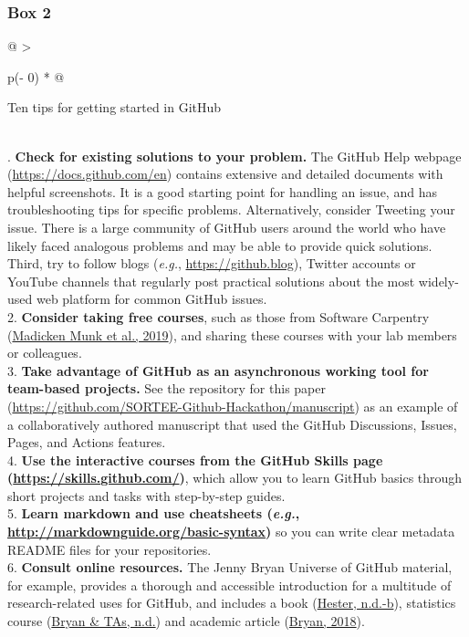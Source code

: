 \hypertarget{tips}{%
\subsubsection{Box 2}\label{tips}}

\begin{tablenos:no-prefix-table-caption}

\begin{longtable}[]{@{}
  >{\raggedright\arraybackslash}p{(\columnwidth - 0\tabcolsep) * }@{}}
\toprule
\begin{minipage}[b]{\linewidth}\raggedright
Ten tips for getting started in GitHub
\end{minipage} \\
\midrule
{}. \textbf{Check for existing solutions to your problem.} The GitHub Help webpage (\url{https://docs.github.com/en}) contains extensive and detailed documents with helpful screenshots. It is a good starting point for handling an issue, and has troubleshooting tips for specific problems. Alternatively, consider Tweeting your issue. There is a large community of GitHub users around the world who have likely faced analogous problems and may be able to provide quick solutions. Third, try to follow blogs (\emph{e.g.}, \url{https://github.blog}), Twitter accounts or YouTube channels that regularly post practical solutions about the most widely-used web platform for common GitHub issues. \\
2. \textbf{Consider taking free courses}, such as those from Software Carpentry (\protect\hyperlink{ref-pjy75gHr}{Madicken Munk et al., 2019}), and sharing these courses with your lab members or colleagues. \\
3. \textbf{Take advantage of GitHub as an asynchronous working tool for team-based projects.} See the repository for this paper (\url{https://github.com/SORTEE-Github-Hackathon/manuscript}) as an example of a collaboratively authored manuscript that used the GitHub Discussions, Issues, Pages, and Actions features. \\
4. \textbf{Use the interactive courses from the GitHub Skills page (\url{https://skills.github.com/})}, which allow you to learn GitHub basics through short projects and tasks with step-by-step guides. \\
5. \textbf{Learn markdown and use cheatsheets (\emph{e.g.}, \url{http://markdownguide.org/basic-syntax})} so you can write clear metadata README files for your repositories. \\
6. \textbf{Consult online resources.} The Jenny Bryan Universe of GitHub material, for example, provides a thorough and accessible introduction for a multitude of research-related uses for GitHub, and includes a book (\protect\hyperlink{ref-ZvrOcg9w}{Hester, n.d.-b}), statistics course (\protect\hyperlink{ref-6CMMeSeD}{Bryan \& TAs, n.d.}) and academic article (\protect\hyperlink{ref-RVetqmsg}{Bryan, 2018}). \\

\end{longtable}
\end{tablenos:no-prefix-table-caption}
